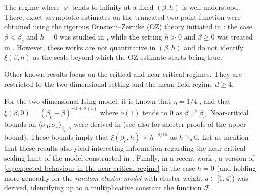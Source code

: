 \documentclass[11pt,a4paper]{article}
\numberwithin{equation}{section}
\theoremstyle{plain}
\theoremstyle{definition}
\begin{document}
The regime where $|x|$ tends to infinity at a fixed $(\beta,h)$ is well-understood. There, exact asymptotic estimates on the truncated two-point function were obtained using the rigorous Ornstein--Zernike (OZ) theory initiated in \cite{campanino2002ornstein}: the case $\beta<\beta_c$ and $h=0$ was studied in \cite{campanino2003ornstein}, while the setting $h>0$ and $\beta\geq 0$ was treated in \cite{ott2020sharp}. However, these works are not quantitative in $(\beta,h)$ and do not identify $\xi(\beta,h)$ as the scale beyond which the OZ estimate starts being true.

Other known results focus on the critical and near-critical regimes. They are restricted to the two-dimensional setting and the 
mean-field regime $d\geq 4$. 

For the two-dimensional Ising model, it is known that $\eta=1/4$ \cite{McCoyWu1973two}, and that $\xi(\beta,0)=(\beta_c-\beta)^{-1+o(1)}$ \cite{duminil2014near,McCoyWu1973two} where $o(1)$ tends to $0$ as $\beta\nearrow \beta_c$. Near-critical bounds on $\langle \sigma_0;\sigma_x\rangle_{\beta_c,h}$ were derived in \cite{CamiaJiangNewmanNearCritical2020,camia2020fk} (see also \cite{KlausenRaoufi2022,jiang2025simple} for shorter proofs of the upper bound). These bounds imply that $\xi(\beta_c,h)\asymp h^{-8/15}$ as $h\searrow 0$. Let us mention that these results also yield interesting information regarding the near-critical scaling limit of the model constructed in \cite{camia2016planar}. Finally, in a recent work \cite{dalimonte2025near}, a version of \eqref{eq:expected behaviour in the near-critical regime} in the case $h=0$ (and holding more generally for the \emph{random cluster model} with cluster weight $q\in [1,4)$) was derived, identifying up to a multiplicative constant the function $\mathcal F$.
\end{document}
